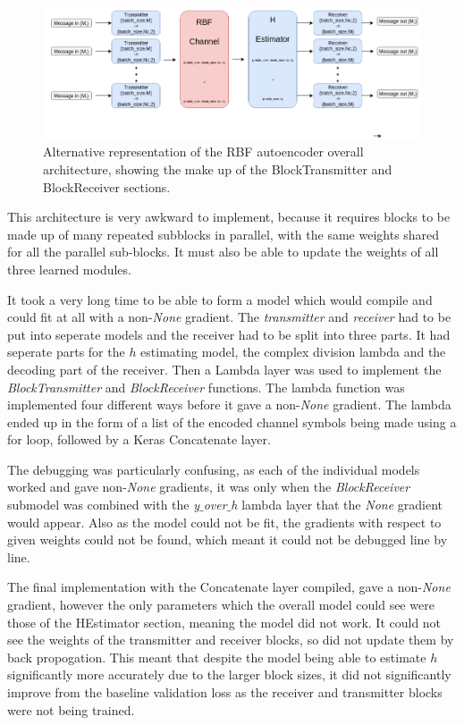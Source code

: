 \documentclass[12pt,onecolumn,letterpaper]{article}
\newcommand{\code}{\textit}
\begin{document}
\begin{figure}
   \centering
   \includegraphics[width=0.95\linewidth]{figures/aoudia_paper/autoencoder_rbf_block_architecture.png}
   \caption{Alternative representation of the RBF autoencoder overall architecture, showing the make up of the BlockTransmitter and BlockReceiver sections.}
   \label{fig:RbfOverallArchitectureDrawIo}
\end{figure}

This architecture is very awkward to implement, because it requires blocks to be made up of many repeated subblocks in parallel, with the same weights shared for all the parallel sub-blocks. It must also be able to update the weights of all three learned modules. 

It took a very long time to be able to form a model which would compile and could fit at all with a non-\code{None} gradient. The \code{transmitter} and \code{receiver} had to be put into seperate models and the receiver had to be split into three parts. It had seperate parts for the $h$ estimating model, the complex division lambda and the decoding part of the receiver. Then a Lambda layer was used to implement the \code{BlockTransmitter} and \code{BlockReceiver} functions. The lambda function was implemented four different ways before it gave a non-\code{None} gradient. The lambda ended up in the form of a list of the encoded channel symbols being made using a for loop, followed by a Keras Concatenate layer.

The debugging was particularly confusing, as each of the individual models worked and gave non-\code{None} gradients, it was only when the \code{BlockReceiver} submodel was combined with the \code{y$\_$over$\_$h} lambda layer that the \code{None} gradient would appear. Also as the model could not be fit, the gradients with respect to given weights could not be found, which meant it could not be debugged line by line.

The final implementation with the Concatenate layer compiled, gave a non-\code{None} gradient, however the only parameters which the overall model could see were those of the HEstimator section, meaning the model did not work. It could not see the weights of the transmitter and receiver blocks, so did not update them by back propogation. This meant that despite the model being able to estimate $h$ significantly more accurately due to the larger block sizes, it did not significantly improve from the baseline validation loss as the receiver and transmitter blocks were not being trained. 
\end{document}
